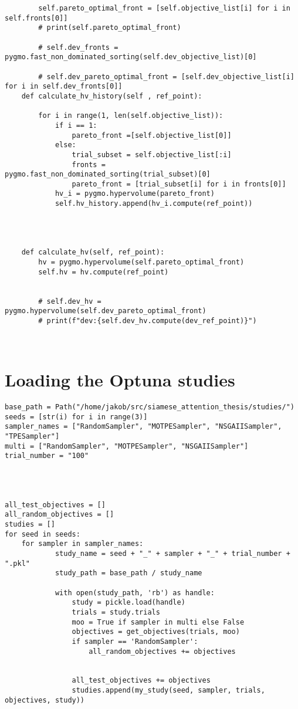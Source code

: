 \documentclass[11pt]{article}
\begin{document}
\begin{verbatim}
        self.pareto_optimal_front = [self.objective_list[i] for i in self.fronts[0]]
        # print(self.pareto_optimal_front)

        # self.dev_fronts = pygmo.fast_non_dominated_sorting(self.dev_objective_list)[0]

        # self.dev_pareto_optimal_front = [self.dev_objective_list[i] for i in self.dev_fronts[0]]
    def calculate_hv_history(self , ref_point):

        for i in range(1, len(self.objective_list)):
            if i == 1:
                pareto_front =[self.objective_list[0]]
            else:
                trial_subset = self.objective_list[:i]
                fronts = pygmo.fast_non_dominated_sorting(trial_subset)[0]
                pareto_front = [trial_subset[i] for i in fronts[0]]
            hv_i = pygmo.hypervolume(pareto_front)
            self.hv_history.append(hv_i.compute(ref_point))




    def calculate_hv(self, ref_point):
        hv = pygmo.hypervolume(self.pareto_optimal_front)
        self.hv = hv.compute(ref_point)


        # self.dev_hv = pygmo.hypervolume(self.dev_pareto_optimal_front)
        # print(f"dev:{self.dev_hv.compute(dev_ref_point)}")



\end{verbatim}

\section{Loading the Optuna studies}
\label{sec:orga0dcef2}

\begin{verbatim}
base_path = Path("/home/jakob/src/siamese_attention_thesis/studies/")
seeds = [str(i) for i in range(3)]
sampler_names = ["RandomSampler", "MOTPESampler", "NSGAIISampler", "TPESampler"]
multi = ["RandomSampler", "MOTPESampler", "NSGAIISampler"]
trial_number = "100"




all_test_objectives = []
all_random_objectives = []
studies = []
for seed in seeds:
    for sampler in sampler_names:
            study_name = seed + "_" + sampler + "_" + trial_number + ".pkl"
            study_path = base_path / study_name

            with open(study_path, 'rb') as handle:
                study = pickle.load(handle)
                trials = study.trials
                moo = True if sampler in multi else False
                objectives = get_objectives(trials, moo)
                if sampler == 'RandomSampler':
                    all_random_objectives += objectives


                all_test_objectives += objectives
                studies.append(my_study(seed, sampler, trials, objectives, study))





\end{verbatim}
\end{document}
